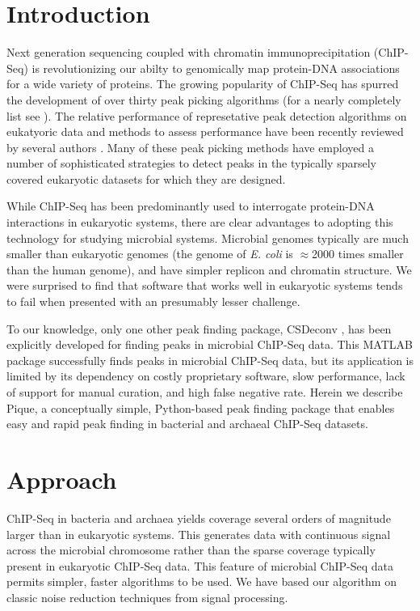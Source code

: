 \documentclass{bioinfo}
\begin{document}
\section{Introduction}

\noindent Next generation sequencing coupled with chromatin
immuno\-pre\-cipi\-tation (ChIP-Seq) is revolutionizing our abilty to
genomically map protein-DNA associations for a wide variety of
proteins.  The growing popularity of ChIP-Seq has spurred the
development of over thirty peak picking algorithms (for a nearly
completely list see \cite{wilbanks}). The relative performance of
represetative peak detection algorithms on eukatyoric data and methods
to assess performance have been recently reviewed by several authors
\cite{Pepke, Laajala_review, too_many_peak_callers, peakranger,
  peak_benchmark}.  Many of these peak picking methods have employed a
number of sophisticated strategies to detect peaks in the typically
sparsely covered eukaryotic datasets for which they are designed.

While ChIP-Seq has been predominantly used to interrogate protein-DNA
interactions in eukaryotic systems, there are clear advantages to
adopting this technology for studying microbial systems. Microbial
genomes typically are much smaller than eukaryotic genomes (the genome
of {\em E. coli} is $\approx$2000 times smaller than the human
genome), and have simpler replicon and chromatin structure.  We were
surprised to find that software that works well in eukaryotic systems
tends to fail when presented with an presumably lesser challenge.

To our knowledge, only one other peak finding package, CSDeconv
\cite{CSDeconv}, has been explicitly developed for finding peaks in
microbial ChIP-Seq data. This MATLAB package successfully finds peaks
in microbial ChIP-Seq data, but its application is limited by its
dependency on costly proprietary software, slow performance, lack of
support for manual curation, and high false negative rate. Herein we
describe Pique, a conceptually simple, Python-based peak finding
package that enables easy and rapid peak finding in bacterial and
archaeal ChIP-Seq datasets.

\section{Approach}

\noindent ChIP-Seq in bacteria and archaea yields coverage several
orders of magnitude larger than in eukaryotic systems.  This generates
data with continuous signal across the microbial chromosome rather
than the sparse coverage typically present in eukaryotic ChIP-Seq
data.  This feature of microbial ChIP-Seq data permits simpler, faster
algorithms to be used. We have based our algorithm on classic noise
reduction techniques from signal processing.
\end{document}
